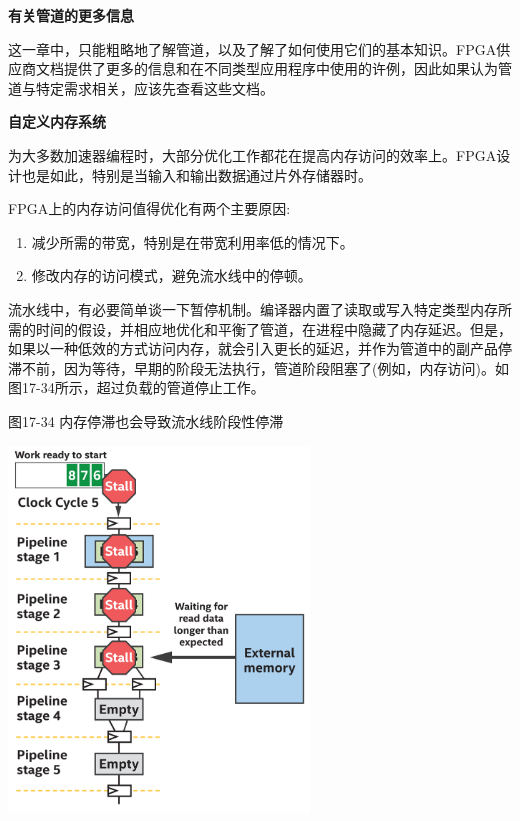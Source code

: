 \hspace*{\fill} \par %
\textbf{有关管道的更多信息}

这一章中，只能粗略地了解管道，以及了解了如何使用它们的基本知识。FPGA供应商文档提供了更多的信息和在不同类型应用程序中使用的许例，因此如果认为管道与特定需求相关，应该先查看这些文档。\par

\hspace*{\fill} \par %
\textbf{自定义内存系统}

为大多数加速器编程时，大部分优化工作都花在提高内存访问的效率上。FPGA设计也是如此，特别是当输入和输出数据通过片外存储器时。\par

FPGA上的内存访问值得优化有两个主要原因:\par

\begin{enumerate}
	\item 减少所需的带宽，特别是在带宽利用率低的情况下。
	\item 修改内存的访问模式，避免流水线中的停顿。
\end{enumerate}

流水线中，有必要简单谈一下暂停机制。编译器内置了读取或写入特定类型内存所需的时间的假设，并相应地优化和平衡了管道，在进程中隐藏了内存延迟。但是，如果以一种低效的方式访问内存，就会引入更长的延迟，并作为管道中的副产品停滞不前，因为等待，早期的阶段无法执行，管道阶段阻塞了(例如，内存访问)。如图17-34所示，超过负载的管道停止工作。\par

\hspace*{\fill} \par %
图17-34 内存停滞也会导致流水线阶段性停滞
\begin{center}
	\includegraphics[width=0.6\textwidth]{content/chapter-17/images/26}
\end{center}

